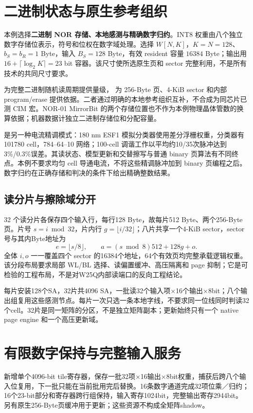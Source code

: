 \section{二进制状态与原生参考组织}
本例选择\textbf{二进制 NOR 存储、本地感测与精确数字归约}。INT8 权重由八个独立数字存储位表示，符号和位权在数字域处理。选择 $W[N,K]$，$K=N=128$、$b_S=b_R=1$ Byte，输入 $B_S=128$ Byte，有效 resident 容量 $16384$ Byte；输出用 $16+\lceil\log_2K\rceil=23$ bit 容器。该尺寸使所选原生页和 sector 完整利用，不是所有技术的共同尺寸要求。

 为完整二进制随机读周期提供量级， 为 256-Byte 页、4-KiB sector 和内部 program/erase 提供依据。二者通过明确的本地参考组织互补，不合成为同芯片已测 CIM 宏。NOR-01 MirrorBit 的两个存储位置也不作为本例物理晶体管数的换算依据；机器数据计独立二进制存储位和分配容量。

 是另一种电流精调模式：180 nm ESF1 模拟分类器使用差分浮栅权重，分类器有 101780 cell，784--64--10 网络；100-cell 调谐工作以平均约10/35次脉冲达到3\%/0.3\%误差。其读状态、模型更新和交替擦写与普通 binary 页算法有不同终点。本例不要求均匀 cell 导通电流，不将这些精调脉冲加到 binary 页编程之后。数字归约在正确存储和判决的条件下给出精确整数结果。

\subsection{读分片与擦除域分开}
32 个读分片各保存四个输入行，每行128 Byte，故每片512 Byte、两个256-Byte页。片号 $s=i\bmod32$，片内行 $g=\lfloor i/32\rfloor$；八片共享一个4-KiB sector，sector号与其内Byte地址为
\[
e=\lfloor s/8\rfloor,\qquad a=(s\bmod8)512+128g+o.
\]
全体 $i,o$ 一一覆盖四个 sector 的16384个地址，64个有效页均完整承载逻辑权重。该分段布局要求局部 WL/BL 选择、读偏置缓冲、高压隔离和 page 抑制；它是可检验的工程布局，不是对W25Q内部读端口的反向工程结论。

每片安装128个SA，32片共4096 SA，一批读32个输入项×16个输出×8bit；八个输出组复用这些感测节点。每片一次只选一条本地字线，不要求同一位线同时判读32个cell。32片是同一矩阵的分区，不是独立矩阵副本；更新始终只有一个 native page engine 和一个高压更新域。

\clearpage
\section{有限数字保持与完整输入服务}

新增单个4096-bit tile寄存器，保存一批32项×16输出×8bit权重，捕获后跨八个输入位复用，下一批只能在当前批用完后替换。16条数字通道完成32项位乘／归约；16个23-bit部分和寄存器跨行组保持，输入寄存1024bit，完整输出寄存2944bit。另有原生256-Byte页缓冲用于更新；这些资源不构成全矩阵shadow。

